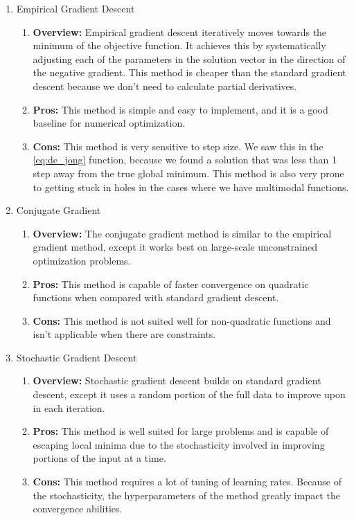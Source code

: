 \documentclass{article}
\begin{document}
\begin{enumerate}
\item Empirical Gradient Descent
    \begin{enumerate}
        \item \textbf{Overview:} Empirical gradient descent iteratively moves towards the minimum of the objective function. It achieves this by systematically adjusting each of the parameters in the solution vector in the direction of the negative gradient. This method is cheaper than the standard gradient descent because we don't need to calculate partial derivatives.
        \item \textbf{Pros:} This method is simple and easy to implement, and it is a good baseline for numerical optimization.
        \item \textbf{Cons:} This method is very sensitive to step size. We saw this in the \ref{eq:de_jong} function, because we found a solution that was less than 1 step away from the true global minimum. This method is also very prone to getting stuck in holes in the cases where we have multimodal functions. 
    \end{enumerate}
\item Conjugate Gradient
    \begin{enumerate}
        \item \textbf{Overview:} The conjugate gradient method is similar to the empirical gradient method, except it works best on large-scale unconstrained optimization problems.
        \item \textbf{Pros:} This method is capable of faster convergence on quadratic functions when compared with standard gradient descent.
        \item \textbf{Cons:} This method is not suited well for non-quadratic functions and isn't applicable when there are constraints. 
    \end{enumerate}
\item Stochastic Gradient Descent
    \begin{enumerate}
        \item \textbf{Overview:} Stochastic gradient descent builds on standard gradient descent, except it uses a random portion of the full data to improve upon in each iteration.
        \item \textbf{Pros:} This method is well suited for large problems and is capable of escaping local minima due to the stochasticity involved in improving portions of the input at a time.
        \item \textbf{Cons:} This method requires a lot of tuning of learning rates. Because of the stochasticity, the hyperparameters of the method greatly impact the convergence abilities.

\end{enumerate}
\end{enumerate}
\end{document}
